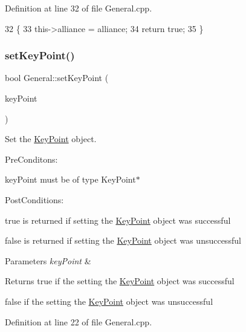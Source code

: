 Definition at line 32 of file General.\+cpp.


\begin{DoxyCode}
32                                            \{
33     this->alliance = alliance;
34     \textcolor{keywordflow}{return} \textcolor{keyword}{true};
35 \}
\end{DoxyCode}
\mbox{\label{classGeneral_ae82ae73aef77ee8379aed00dcd5fe953}} 
\subsubsection{\texorpdfstring{set\+Key\+Point()}{setKeyPoint()}}
{\footnotesize\ttfamily bool General\+::set\+Key\+Point (\begin{DoxyParamCaption}\item[{\hyperlink{classKeyPoint}{Key\+Point} $\ast$}]{key\+Point }\end{DoxyParamCaption})}



Set the \hyperlink{classKeyPoint}{Key\+Point} object. 

Pre\+Conditons\+:
\begin{DoxyItemize}
\item key\+Point must be of type Key\+Point$\ast$
\end{DoxyItemize}

Post\+Conditions\+:
\begin{DoxyItemize}
\item true is returned if setting the \hyperlink{classKeyPoint}{Key\+Point} object was successful
\item false is returned if setting the \hyperlink{classKeyPoint}{Key\+Point} object was unsuccessful
\end{DoxyItemize}


\begin{DoxyParams}{Parameters}
{\em key\+Point} & \\
\hline
\end{DoxyParams}
\begin{DoxyReturn}{Returns}
true if the setting the \hyperlink{classKeyPoint}{Key\+Point} object was successful 

false if the setting the \hyperlink{classKeyPoint}{Key\+Point} object was unsuccessful 
\end{DoxyReturn}


Definition at line 22 of file General.\+cpp.


